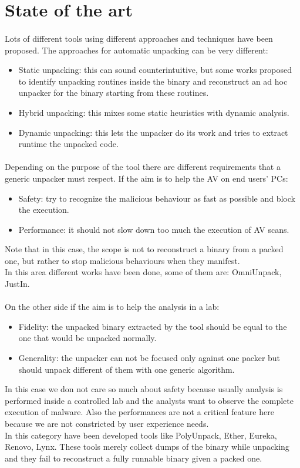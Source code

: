 \section{State of the art}
\paragraph{}
Lots of different tools using different approaches and techniques have been proposed. 
The approaches for automatic unpacking can be very different:
\begin{itemize}
\item Static unpacking: this can sound counterintuitive, but some works proposed to identify unpacking routines inside the binary and reconstruct an ad hoc unpacker for the binary starting from these routines.
\item Hybrid unpacking: this mixes some static heuristics with dynamic analysis.
\item Dynamic unpacking: this lets the unpacker do its work and tries to extract runtime the unpacked code. 
\end{itemize}
\paragraph{}
Depending on the purpose of the tool there are different requirements that a generic unpacker must respect. If the aim is to help the AV on end users' PCs:
\begin{itemize}
\item Safety: try to recognize the malicious behaviour as fast as possible and block the execution. 
\item Performance: it should not slow down too much the execution of AV scans.
\end{itemize}
Note that in this case, the scope is not to reconstruct a binary from a packed one, but rather to stop malicious behaviours when they manifest. \\
In this area different works have been done, some of them are: OmniUnpack, JustIn.
\paragraph{}
On the other side if the aim is to help the analysis in a lab:
\begin{itemize}
\item Fidelity: the unpacked binary extracted by the tool should be equal to the one that would be unpacked normally. 
\item Generality: the unpacker can not be focused only against one packer but should unpack different of them with one generic algorithm.
\end{itemize}
In this case we don not care so much about safety because usually analysis is performed inside a controlled lab and the analysts want to observe the complete execution of malware. Also the performances are not a critical feature here because we are not constricted by user experience needs.\\
In this category have been developed tools like PolyUnpack, Ether, Eureka, Renovo, Lynx.
These tools merely collect dumps of the binary while unpacking and they fail to reconstruct a fully runnable binary given a packed one.


